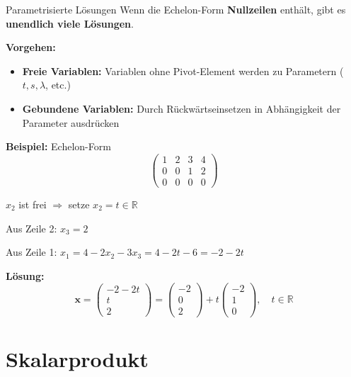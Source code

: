 \documentclass[a4paper, fontsize=7pt]{scrartcl}
\begin{document}
\begin{subbox}{Parametrisierte Lösungen}
Wenn die Echelon-Form \textbf{Nullzeilen} enthält, gibt es \textbf{unendlich viele Lösungen}.

\textbf{Vorgehen:}
\begin{itemize}
    \item \textbf{Freie Variablen:} Variablen ohne Pivot-Element werden zu Parametern ($t, s, \lambda$, etc.)
    \item \textbf{Gebundene Variablen:} Durch Rückwärtseinsetzen in Abhängigkeit der Parameter ausdrücken
\end{itemize}

\textbf{Beispiel:} Echelon-Form
$$\left(\begin{array}{ccc|c}
1 & 2 & 3 & 4 \\
0 & 0 & 1 & 2 \\
0 & 0 & 0 & 0
\end{array}\right)$$

$x_2$ ist frei $\Rightarrow$ setze $x_2 = t \in \mathbb{R}$

Aus Zeile 2: $x_3 = 2$

Aus Zeile 1: $x_1 = 4 - 2x_2 - 3x_3 = 4 - 2t - 6 = -2 - 2t$

\textbf{Lösung:}
$$\mathbf{x} = \begin{pmatrix} -2 - 2t \\ t \\ 2 \end{pmatrix} = \begin{pmatrix} -2 \\ 0 \\ 2 \end{pmatrix} + t \begin{pmatrix} -2 \\ 1 \\ 0 \end{pmatrix}, \quad t \in \mathbb{R}$$
\end{subbox}

\section{Skalarprodukt}
\end{document}
